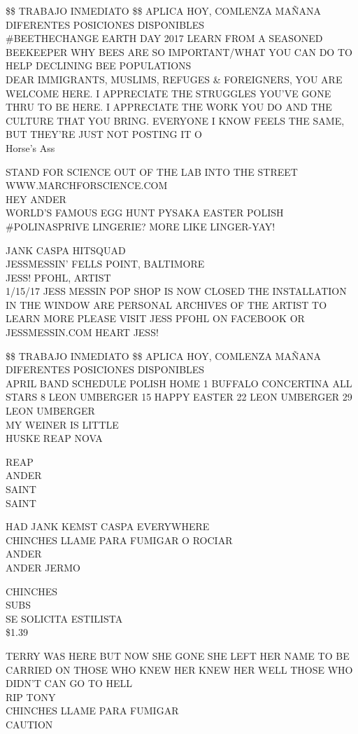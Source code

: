 \documentclass[10pt,letterpaper]{article}
\begin{document}
\$\$ TRABAJO INMEDIATO \$\$ APLICA HOY, COMLENZA MAÑANA DIFERENTES POSICIONES DISPONIBLES\\
\#BEETHECHANGE EARTH DAY 2017 LEARN FROM A SEASONED BEEKEEPER WHY BEES ARE SO IMPORTANT/WHAT YOU CAN DO TO HELP DECLINING BEE POPULATIONS\\
DEAR IMMIGRANTS, MUSLIMS, REFUGES \& FOREIGNERS, YOU ARE WELCOME HERE.  I APPRECIATE THE STRUGGLES YOU'VE GONE THRU TO BE HERE.  I APPRECIATE THE WORK YOU DO AND THE CULTURE THAT YOU BRING.  EVERYONE I KNOW FEELS THE SAME, BUT THEY'RE JUST NOT POSTING IT O\\
Horse's Ass

STAND FOR SCIENCE OUT OF THE LAB INTO THE STREET WWW.MARCHFORSCIENCE.COM\\
HEY ANDER\\
WORLD'S FAMOUS EGG HUNT PYSAKA EASTER POLISH\\
\#POLINASPRIVE LINGERIE? MORE LIKE LINGER{-}YAY!

JANK CASPA HITSQUAD\\
JESSMESSIN' FELLS POINT, BALTIMORE\\
JESS! PFOHL, ARTIST\\
1/15/17 JESS MESSIN POP SHOP IS NOW CLOSED THE INSTALLATION IN THE WINDOW ARE PERSONAL ARCHIVES OF THE ARTIST TO LEARN MORE PLEASE VISIT JESS PFOHL ON FACEBOOK OR JESSMESSIN.COM HEART JESS!

\$\$ TRABAJO INMEDIATO \$\$ APLICA HOY, COMLENZA MAÑANA DIFERENTES POSICIONES DISPONIBLES\\
APRIL BAND SCHEDULE POLISH HOME 1 BUFFALO CONCERTINA ALL STARS 8 LEON UMBERGER 15 HAPPY EASTER 22 LEON UMBERGER 29 LEON UMBERGER\\
MY WEINER IS LITTLE\\
HUSKE REAP NOVA

REAP\\
ANDER\\
SAINT\\
SAINT

HAD JANK KEMST CASPA EVERYWHERE\\
CHINCHES LLAME PARA FUMIGAR O ROCIAR\\
ANDER\\
ANDER JERMO

CHINCHES\\
SUBS\\
SE SOLICITA ESTILISTA\\
\$1.39

TERRY WAS HERE BUT NOW SHE GONE SHE LEFT HER NAME TO BE CARRIED ON THOSE WHO KNEW HER KNEW HER WELL THOSE WHO DIDN'T CAN GO TO HELL\\
RIP TONY\\
CHINCHES LLAME PARA FUMIGAR\\
CAUTION
\end{document}
